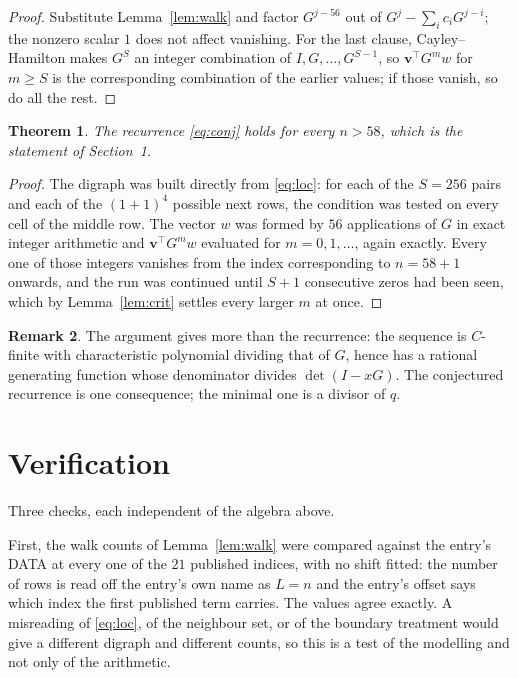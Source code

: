 \documentclass[11pt,a4paper]{article}
\theoremstyle{plain}
\newtheorem{theorem}{Theorem}
\theoremstyle{definition}
\newtheorem{remark}[theorem]{Remark}
\begin{document}
\begin{proof}
Substitute Lemma~\ref{lem:walk} and factor $G^{j-56}$ out of
$G^{j}-\sum_ic_iG^{j-i}$; the nonzero scalar $1$ does not affect
vanishing. For the last clause, Cayley--Hamilton makes $G^{S}$ an integer combination of
$I,G,\dots,G^{S-1}$, so $\mathbf{v}^{\!\top}G^{m}w$ for $m\ge S$ is the corresponding
combination of the earlier values; if those vanish, so do all the rest.
\end{proof}

\begin{theorem}
The recurrence \eqref{eq:conj} holds for every $n>58$, which is the statement of
Section~1.
\end{theorem}

\begin{proof}
The digraph was built directly from \eqref{eq:loc}: for each of the $S=256$ pairs and each
of the $(1+1)^{4}$ possible next rows, the condition was tested on every cell of
the middle row. The vector $w$ was formed by $56$ applications of $G$ in exact integer
arithmetic and $\mathbf{v}^{\!\top}G^{m}w$ evaluated for $m=0,1,\dots$, again exactly.
Every one of those integers vanishes from the index corresponding to $n=58+1$ onwards,
and the run was continued until $S+1$ consecutive zeros had been seen, which by
Lemma~\ref{lem:crit} settles every larger $m$ at once.
\end{proof}

\begin{remark}
The argument gives more than the recurrence: the sequence is $C$-finite with characteristic
polynomial dividing that of $G$, hence has a rational generating function whose denominator
divides $\det(I-xG)$. The conjectured recurrence is one consequence; the minimal one is a
divisor of $q$.
\end{remark}

\section{Verification}

Three checks, each independent of the algebra above.

First, the walk counts of Lemma~\ref{lem:walk} were compared against the entry's DATA at
every one of the $21$ published indices, with no shift fitted: the number of rows is
read off the entry's own name as $L=n$ and the entry's offset says which index the first
published term carries. The values agree exactly. A misreading of \eqref{eq:loc}, of the
neighbour set, or of the boundary treatment would give a different digraph and different
counts, so this is a test of the modelling and not only of the arithmetic.
\end{document}
